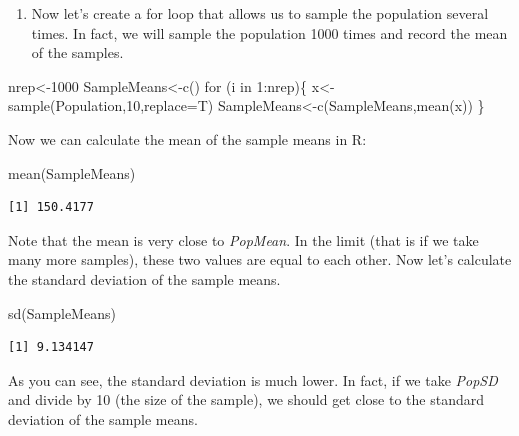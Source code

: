 \documentclass[
  letterpaper,
  DIV=11,
  numbers=noendperiod]{scrreprt}
\newenvironment{Shaded}{\begin{snugshade}}{\end{snugshade}}
\newcommand{\AttributeTok}[1]{\textcolor[rgb]{0.40,0.45,0.13}{#1}}
\newcommand{\ControlFlowTok}[1]{\textcolor[rgb]{0.00,0.23,0.31}{#1}}
\newcommand{\DecValTok}[1]{\textcolor[rgb]{0.68,0.00,0.00}{#1}}
\newcommand{\FunctionTok}[1]{\textcolor[rgb]{0.28,0.35,0.67}{#1}}
\newcommand{\NormalTok}[1]{\textcolor[rgb]{0.00,0.23,0.31}{#1}}
\newcommand{\OtherTok}[1]{\textcolor[rgb]{0.00,0.23,0.31}{#1}}
\newcommand{\SpecialCharTok}[1]{\textcolor[rgb]{0.37,0.37,0.37}{#1}}
\providecommand{\tightlist}{%
  \setlength{\itemsep}{0pt}\setlength{\parskip}{0pt}}\usepackage{longtable,booktabs,array}
\begin{document}
\begin{enumerate}
\def\labelenumi{\arabic{enumi}.}
\setcounter{enumi}{1}
\tightlist
\item
  Now let's create a for loop that allows us to sample the population
  several times. In fact, we will sample the population 1000 times and
  record the mean of the samples.
\end{enumerate}

\begin{Shaded}
\begin{Highlighting}[numbers=left,,]
\NormalTok{nrep}\OtherTok{\textless{}{-}}\DecValTok{1000}
\NormalTok{SampleMeans}\OtherTok{\textless{}{-}}\FunctionTok{c}\NormalTok{()}
\ControlFlowTok{for}\NormalTok{ (i }\ControlFlowTok{in} \DecValTok{1}\SpecialCharTok{:}\NormalTok{nrep)\{}
\NormalTok{  x}\OtherTok{\textless{}{-}}\FunctionTok{sample}\NormalTok{(Population,}\DecValTok{10}\NormalTok{,}\AttributeTok{replace=}\NormalTok{T)}
\NormalTok{  SampleMeans}\OtherTok{\textless{}{-}}\FunctionTok{c}\NormalTok{(SampleMeans,}\FunctionTok{mean}\NormalTok{(x))}
\NormalTok{\}}
\end{Highlighting}
\end{Shaded}

Now we can calculate the mean of the sample means in R:

\begin{Shaded}
\begin{Highlighting}[numbers=left,,]
\FunctionTok{mean}\NormalTok{(SampleMeans)}
\end{Highlighting}
\end{Shaded}

\begin{verbatim}
[1] 150.4177
\end{verbatim}

Note that the mean is very close to \emph{PopMean}. In the limit (that
is if we take many more samples), these two values are equal to each
other. Now let's calculate the standard deviation of the sample means.

\begin{Shaded}
\begin{Highlighting}[numbers=left,,]
\FunctionTok{sd}\NormalTok{(SampleMeans)}
\end{Highlighting}
\end{Shaded}

\begin{verbatim}
[1] 9.134147
\end{verbatim}

As you can see, the standard deviation is much lower. In fact, if we
take \emph{PopSD} and divide by 10 (the size of the sample), we should
get close to the standard deviation of the sample means.
\end{document}
